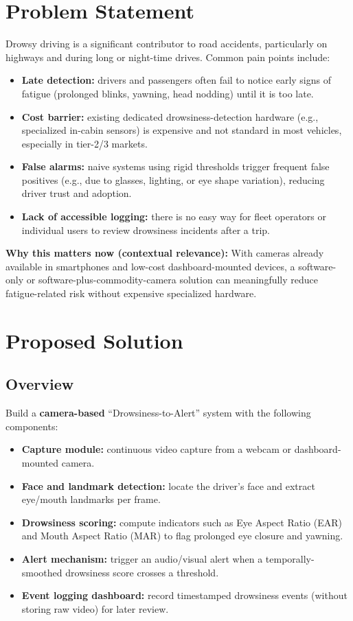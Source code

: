 \documentclass[11pt,a4paper]{article}
\begin{document}
\section{Problem Statement}
Drowsy driving is a significant contributor to road
accidents, particularly on highways and during long or
night-time drives. Common pain points include:
\begin{itemize}[leftmargin=0.7cm]
    \item \textbf{Late detection:} drivers and passengers often fail to notice early signs of fatigue (prolonged blinks, yawning, head nodding) until it is too late.
    \item \textbf{Cost barrier:} existing dedicated drowsiness-detection hardware (e.g., specialized in-cabin sensors) is expensive and not standard in most vehicles, especially in tier-2/3 markets.
    \item \textbf{False alarms:} naive systems using rigid thresholds trigger frequent false positives (e.g., due to glasses, lighting, or eye shape variation), reducing driver trust and adoption.
    \item \textbf{Lack of accessible logging:} there is no easy way for fleet operators or individual users to review drowsiness incidents after a trip.
\end{itemize}

\textbf{Why this matters now (contextual relevance):}
With cameras already available in smartphones and
low-cost dashboard-mounted devices, a software-only or
software-plus-commodity-camera solution can meaningfully
reduce fatigue-related risk without expensive
specialized hardware.

\section{Proposed Solution}
\subsection{Overview}
Build a \textbf{camera-based} ``Drowsiness-to-Alert''
system with the following components:
\begin{itemize}[leftmargin=0.7cm]
    \item \textbf{Capture module:} continuous video capture from a webcam or dashboard-mounted camera.
    \item \textbf{Face and landmark detection:} locate the driver's face and extract eye/mouth landmarks per frame.
    \item \textbf{Drowsiness scoring:} compute indicators such as Eye Aspect Ratio (EAR) and Mouth Aspect Ratio (MAR) to flag prolonged eye closure and yawning.
    \item \textbf{Alert mechanism:} trigger an audio/visual alert when a temporally-smoothed drowsiness score crosses a threshold.
    \item \textbf{Event logging dashboard:} record timestamped drowsiness events (without storing raw video) for later review.
\end{itemize}
\end{document}
